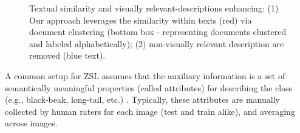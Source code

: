 \documentclass[11pt,a4paper]{article}
\newcommand\gal[1]{\textcolor{bright}{\textbf{GAL:} #1 }}
\newcommand\tzuf[1]{\textcolor{blue}{\textbf{TZUF:} #1 }}
\begin{document}
\begin{figure}[t]
\centering
{}
 \caption{Textual similarity and visually relevant-descriptions enhancing: (1) Our approach leverages the similarity within %
 texts (red) via document clustering (bottom box - representing documents clustered and labeled alphabetically); %
 (2) non-visually relevant description are removed (blue text).} %
\label{fig:bird_example}%
\end{figure}

A common setup for ZSL assumes that the auxiliary information is a set of semantically meaningful properties (called attributes) for describing the class (e.g., black-beak, long-tail, etc.) \citep{farhadi2009describing,lampert2009learning}. Typically, these attributes are  manually collected by human raters for each image (test and train alike), and averaging across images.
\end{document}
